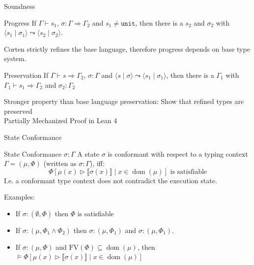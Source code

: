 \documentclass{sdqbeamer}
\newcommand{\code}[1]{\texttt{#1}}
\newcommand{\tuple}[2]{\langle #1 \mid #2 \rangle}
\newcommand{\bbracket}[1]{\llbracket #1 \rrbracket}
\DeclareMathOperator{\dom}{dom}
\begin{document}
\begin{frame}[fragile]{Soundness}
  \begin{greenblock}{Progress}
    If $\Gamma \vdash s_1$, $\sigma : \Gamma \Rightarrow \Gamma_2$ and $s_1 \neq \code{unit}$, then there is a $s_2$ and $\sigma_2$ with $\tuple{s_1}{\sigma_1} \leadsto \tuple{s_2}{\sigma_2}$.
  \end{greenblock}

  Corten strictly refines the base language, therefore progress depends on base type system.

  \begin{greenblock}{Preservation}
    If $\Gamma \vdash s \Rightarrow \Gamma_2$, $\sigma : \Gamma$ and $\tuple{s}{\sigma} \leadsto \tuple{s_1}{\sigma_1}$, then there is a $\Gamma_1$ with $\Gamma_1 \vdash s_1 \Rightarrow \Gamma_2$ and $\sigma_2 : \Gamma_2$
  \end{greenblock}

  Stronger property than base language preservation: Show that refined types are preserved\\
  
  Partially Mechanized Proof in Lean 4
\end{frame}

\begin{frame}[fragile]{State Conformance}
  \begin{greenblock}{State Conformance $\sigma : \Gamma$}
    A state $\sigma$ is conformant with respect to a typing context $\Gamma = (\mu, \Phi)$ (written as $\sigma : \Gamma$), iff:
    $$
      \Phi[\mu(x) \triangleright \bbracket{\sigma(x)} \mid x \in \dom(\mu)] \text{ is satisfiable}
    $$
    I.e. a conformant type context does not contradict the execution state.
  \end{greenblock}
  Examples:
  \begin{itemize}
    \item If $\sigma : (\emptyset, \Phi)$ then $\Phi$ is satisfiable
    \item If $\sigma : (\mu, \Phi_1 \wedge \Phi_2)$ then $\sigma : (\mu, \Phi_1)$ and $\sigma : (\mu, \Phi_1)$.
    \item If $\sigma : (\mu, \Phi)$ and $\text{FV}(\Phi) \subseteq \dom(\mu)$, then $\vDash \Phi[\mu(x) \triangleright \bbracket{\sigma(x)} \mid x \in \dom(\mu)]$
  \end{itemize}
\end{frame}
\end{document}
